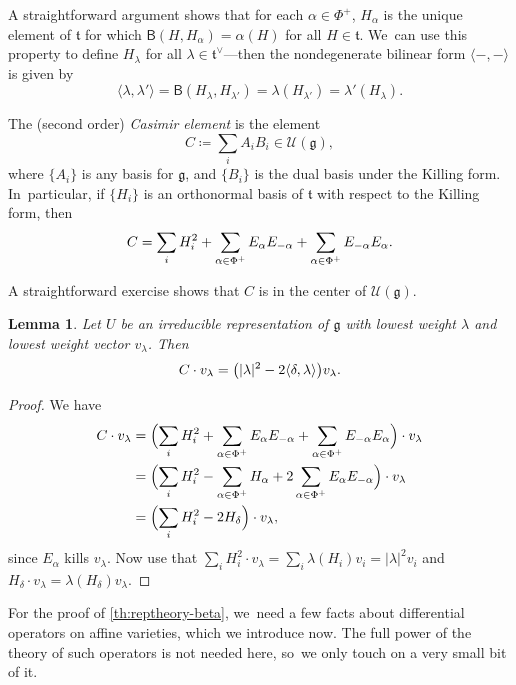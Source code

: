 \documentclass[JEP,XML,SOM,Unicode,published]{cedram}
\newtheorem{lem}[thm]{Lemma}
\let\originalleft\left
\let\originalright\right
\renewcommand{\left}{\mathopen{}\mathclose\bgroup\originalleft}
\renewcommand{\right}{\aftergroup\egroup\originalright}
\begin{document}
A straightforward argument shows that for each $\alpha\in \Phi^+$, $H_\alpha$ is the unique element of $\mathfrak{t}$ for which $\mathsf{B}(H, H_\alpha) = \alpha(H)$ for all $H\in \mathfrak{t}$. We~can use this property to define $H_\lambda$ for all $\lambda\in \mathfrak{t}^\vee$---then the nondegenerate bilinear form $\langle-,-\rangle$ is given by
\[
\langle \lambda, \lambda'\rangle = \mathsf{B}(H_\lambda, H_{\lambda'}) = \lambda(H_{\lambda'}) = \lambda'(H_{\lambda}).
\]

\begin{dfn}
The (second order) \emph{Casimir element} is the element
\[
C\coloneqq \sum_i A_iB_i \in \mathcal{U}(\mathfrak{g}),
\]
where $\{A_i\}$ is any basis for $\mathfrak{g}$, and $\{B_i\}$ is the dual basis under the Killing form. In~particular, if $\{H_i\}$ is an orthonormal basis of $\mathfrak{t}$ with respect to the Killing form, then
\[
C = \sum_i H_i^2 + \sum_{\alpha\in\Phi^+} E_\alpha E_{-\alpha} + \sum_{\alpha\in\Phi^+} E_{-\alpha}E_{\alpha}.\qedhere
\]
\end{dfn}
A straightforward exercise
shows that $C$ is in the center of $\mathcal{U}(\mathfrak{g})$.

\begin{lem}\label{irred-rep-cas}
Let $U$ be an irreducible representation of $\mathfrak{g}$ with
lowest
weight $\lambda$ and
lowest
weight vector $v_\lambda$. Then
\[
C\cdot v_\lambda = \left(|\lambda|^2 - 2\langle\delta,\lambda\rangle\right)v_\lambda.
\]
\end{lem}

\begin{proof}
We have
\begin{align*}
C\cdot v_\lambda &= \Bigl(\sum_i H_i^2 + \sum_{\alpha\in\Phi^+} E_\alpha E_{-\alpha} + \sum_{\alpha\in\Phi^+} E_{-\alpha}E_{\alpha}\Bigr)\cdot v_\lambda\\
&= \Bigl(\sum_i H_i^2 - \sum_{\alpha\in\Phi^+} H_\alpha + 2\sum_{\alpha\in\Phi^+} E_{\alpha}E_{-\alpha}\Bigr)\cdot v_\lambda\\
&= \Bigl(\sum_i H_i^2 -2H_\delta\Bigr)\cdot v_\lambda,
\end{align*}
since $E_\alpha$ kills $v_\lambda$. Now use that $ \sum_i H_i^2\cdot v_\lambda = \sum_i \lambda(H_i)v_i = |\lambda|^2v_i$ and $H_\delta\cdot v_\lambda = \lambda(H_\delta)v_\lambda$.
\end{proof}

For the proof of \cref{th:reptheory-beta}, we~need
a few facts about differential operators on affine varieties, which we introduce now. The full power of the theory of such operators is not needed here, so~we only touch on a very small bit of it.
\end{document}
